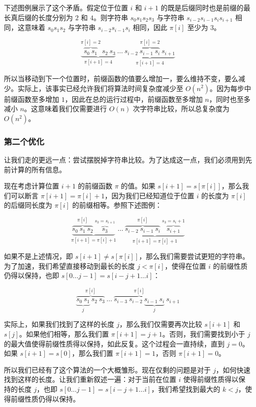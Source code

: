 下述图例展示了这个矛盾。假定位于位置 $i$ 和 $i + 1$ 的既是后缀同时也是前缀的最长真后缀的长度分别为 $2$ 和 $4$。则字符串 $s_0 s_1 s_2 s_3$ 与字符串 $s_{i - 2} s_{i - 1} s_i s_{i + 1}$ 相同，这意味着 $s_0 s_1 s_2$ 与字符串 $s_{i - 2} s_{i - 1} s_i$ 相同，因此 $\pi[i]$ 至少为 $3$。

$$
\underbrace{\overbrace{s_0 ~ s_1}^{\pi[i] = 2} ~ s_2 ~ s_3}_{\pi[i+1] = 4} ~ \dots ~ \underbrace{s_{i-2} ~ \overbrace{s_{i-1} ~ s_{i}}^{\pi[i] = 2} ~ s_{i+1}}_{\pi[i+1] = 4}
$$

所以当移动到下一个位置时，前缀函数的值要么增加一，要么维持不变，要么减少。实际上，该事实已经允许我们将算法时间复杂度减少至 $O(n^2)$。因为每步中前缀函数至多增加 $1$，因此在总的运行过程中，前缀函数至多增加 $n$，同时也至多减小 $n$。这意味着我们仅需要进行 $O(n)$ 次字符串比较，所以总复杂度为 $O(n^2)$。

\subsubsection{第二个优化}

让我们走的更远一点：尝试摆脱掉字符串比较。为了达成这一点，我们必须用到先前计算的所有信息。

现在考虑计算位置 $i + 1$ 的前缀函数 $\pi$ 的值。如果 $s[i + 1] = s[\pi[i]]$，那么我们可以断言 $\pi[i + 1] = \pi[i] + 1$，因为我们已经知道位于位置 $i$ 的长度为 $\pi[i]$ 的后缀同长度为 $\pi[i]$ 的前缀相等。参照下述图例：

$$
\underbrace{\overbrace{s_0 ~ s_1 ~ s_2}^{\pi[i]} ~ \overbrace{s_3}^{s_3 = s_{i+1}}}_{\pi[i+1] = \pi[i] + 1} ~ \dots ~ \underbrace{\overbrace{s_{i-2} ~ s_{i-1} ~ s_{i}}^{\pi[i]} ~ \overbrace{s_{i+1}}^{s_3 = s_i + 1}}_{\pi[i+1] = \pi[i] + 1}
$$

如果不是上述情况，即 $s[i + 1] \neq s[\pi[i]]$，那么我们需要尝试更短的字符串。为了加速，我们希望直接移动到最长的长度 $j < \pi[i]$，使得在位置 $i$ 的前缀性质仍得以保持，也即 $s[0 \dots j - 1] = s[i - j + 1 \dots i]$：

$$
\overbrace{\underbrace{s_0 ~ s_1}_j ~ s_2 ~ s_3}^{\pi[i]} ~ \dots ~ \overbrace{s_{i-3} ~ s_{i-2} ~ \underbrace{s_{i-1} ~ s_{i}}_j}^{\pi[i]} ~ s_{i+1}
$$

实际上，如果我们找到了这样的长度 $j$，那么我们仅需要再次比较 $s[i + 1]$ 和 $s[j]$。如果他们相等，那么我们置 $\pi[i + 1] = j + 1$。否则，我们需要找到小于 $j$ 的最大值使得前缀性质得以保持，如此反复。这个过程会一直持续，直到 $j = 0$。如果 $s[i + 1] = s[0]$，那么我们置 $\pi[i + 1] = 1$，否则 $\pi[i + 1] = 0$。

所以我们已经有了这个算法的一个大概雏形。现在仅剩的问题是对于 $j$，如何快速找到这样的长度。让我们重新叙述一遍：对于当前在位置 $i$ 使得前缀性质得以保持的长度 $j$，也即 $s[0 \dots j - 1] = s[i - j + 1 \dots i]$，我们希望找到最大的 $k < j$，使得前缀性质仍得以保持。

